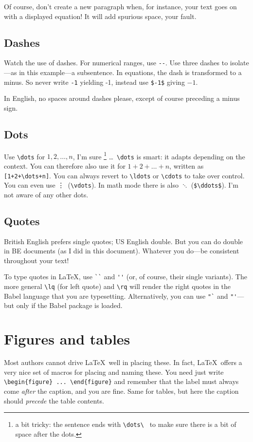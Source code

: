 \documentclass{article}
\begin{document}
Of course, don't create a new paragraph when, for instance, your text goes on with a displayed equation!  It will add spurious space, your fault.


\subsection{Dashes}
Watch the use of dashes.  For numerical ranges, use \verb+--+.  Use three  dashes to isolate---as in this example---a subsentence.  In equations, the dash is transformed to a minus.  So never write \verb+-1+ yielding -1, instead use \verb+$-1$+ giving $-1$.

In English, no spaces around dashes please, except of course preceding a minus sign.

\subsection{Dots}
Use \verb+\dots+ for $1,2,\dots,n$, I'm sure%
\footnote{a bit tricky: the sentence ends with \protect\verb+\dots\ + to make sure
there is a bit of space after the dots.}%
\dots\ \verb+\dots+ is smart: it adapts depending on the context.  You can therefore also use it for $1+2+\dots+n$, written as \verb-[1+2+\dots+n]-. You can always revert to \verb+\ldots+ or \verb+\cdots+ to take over control.  You can even use \vdots\ (\verb+\vdots+).  In math mode there is also $\ddots$ (\verb+$\ddots$+).  I'm not aware of any other dots.

\subsection{Quotes}
British English prefers single quotes; US English double.  But you can do double in BE documents (as I did in this document).  Whatever you do---be consistent throughout your text!

To type quotes in \LaTeX, use \verb+``+ and \verb+''+ (or, of course, their single variants).  The more general \verb+\lq+ (for left quote) and \verb+\rq+ will render the right quotes in the Babel language that you are typesetting.  Alternatively, you can use \verb+"`+ and \verb+"'+---but only if the Babel package is loaded.




\section{Figures and tables}
Most authors cannot drive \LaTeX\ well in placing these.  In fact, \LaTeX\ offers a very nice set of macros for placing and naming these.  You need just write \verb+\begin{figure} ... \end{figure}+ and remember that the label must always come \textsl{after} the caption, and you are fine.  Same for tables, but here the caption should \textsl{precede} the table contents.
\end{document}
